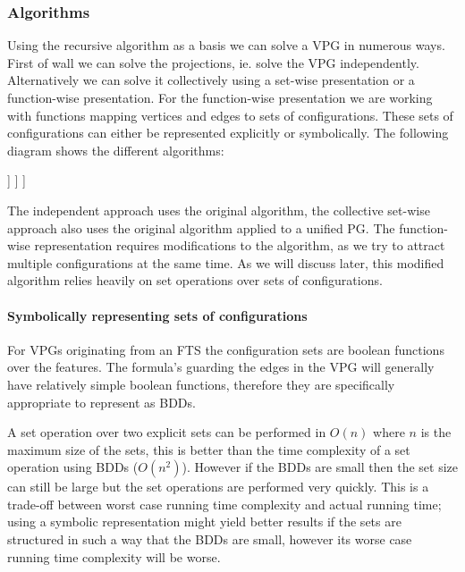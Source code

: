 \subsubsection{Algorithms}
Using the recursive algorithm as a basis we can solve a VPG in numerous ways. First of wall we can solve the projections, ie. solve the VPG independently. Alternatively we can solve it collectively using a set-wise presentation or a function-wise presentation. For the function-wise presentation we are working with functions mapping vertices and edges to sets of configurations. These sets of configurations can either be represented explicitly or symbolically. The following diagram shows the different algorithms:
\begin{center}
	\begin{forest}
		[Recursive algorithm, for tree={parent anchor=south, child anchor=north, align=center, s sep=5mm}
		[Independent]
		[Collective
		[Set-wise]
		[Function-wise
		[Explicit]
		[Symbolic]
		]
		]
		]
	\end{forest}
\end{center}
The independent approach uses the original algorithm, the collective set-wise approach also uses the original algorithm applied to a unified PG. The function-wise representation requires modifications to the algorithm, as we try to attract multiple configurations at the same time. As we will discuss later, this modified algorithm relies heavily on set operations over sets of configurations. 

\paragraph{Symbolically representing sets of configurations}
\label{sec:symrepconfs}
For VPGs originating from an FTS the configuration sets are boolean functions over the features. The formula's guarding the edges in the VPG will generally have relatively simple boolean functions, therefore they are specifically appropriate to represent as BDDs.

A set operation over two explicit sets can be performed in $O(n)$ where $n$ is the maximum size of the sets, this is better than the time complexity of a set operation using BDDs ($O(n^2)$). However if the BDDs are small then the set size can still be large but the set operations are performed very quickly. This is a trade-off between worst case running time complexity and actual running time; using a symbolic representation might yield better results if the sets are structured in such a way that the BDDs are small, however its worse case running time complexity will be worse.

